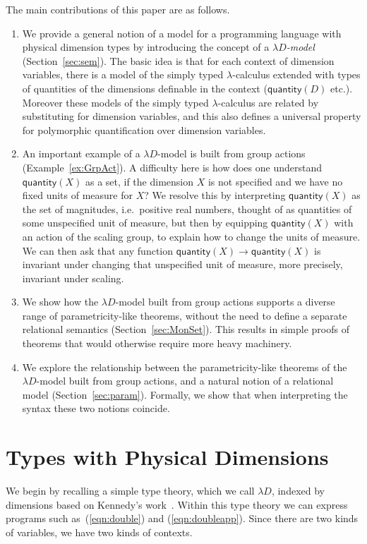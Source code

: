 \documentclass[a4paper,UKenglish]{lipics}
\newcommand{\msf}[1]{\mathsf{#1}} %
\newcommand{\qnt}{\msf{quantity}}
\newcommand{\Dvar}{X}
\begin{document}
The main contributions of this paper are as follows.
\begin{enumerate}
\item We provide a general notion of a model for a programming language with physical dimension types by introducing the concept of a \emph{$\lambda D$-model} (Section~\ref{sec:sem}). The basic idea is that for each context of dimension variables, there is a model of the simply typed $\lambda$-calculus extended with types of quantities of the dimensions definable in the context ($\qnt(D)$ etc.). Moreover these models of the simply typed $\lambda$-calculus are related by substituting for dimension variables, and this also defines a universal property for polymorphic quantification over dimension variables.

\item An important example of a $\lambda D$-model is built from group actions (Example~\ref{ex:GrpAct}).
A difficulty here is how does one understand $\qnt(\Dvar)$ as a set, if the dimension $\Dvar$ is not specified and we have no fixed units of measure for $\Dvar$? We resolve this by interpreting $\qnt(\Dvar)$ as the set of magnitudes, i.e.~positive real numbers, thought of as quantities of some unspecified unit of measure, but then by equipping $\qnt(\Dvar)$ with an action of the scaling group, to explain how to change the units of measure. We can then ask that any function $\qnt(\Dvar)\to\qnt(\Dvar)$ is invariant under changing that unspecified unit of measure, more precisely, invariant under scaling.

\item We show how the $\lambda D$-model built from group actions supports a diverse range of parametricity-like theorems, without the need to define a separate relational semantics (Section~\ref{sec:MonSet}). This results in simple proofs of theorems that would otherwise require more heavy machinery.

\item We explore the relationship between the parametricity-like theorems of the $\lambda D$-model built from group actions, and a natural notion of a relational model (Section~\ref{sec:param}). Formally, we show that when interpreting the syntax these two notions coincide.
\end{enumerate}


\section{Types with Physical Dimensions}
\label{sec:Not}
We begin by recalling a simple type theory, which we call $\lambda D$, indexed by dimensions based on Kennedy's work~\cite{Kennedy:1997:RPU:263699.263761}. Within this type theory we can express programs such as~(\ref{eqn:double}) and (\ref{eqn:doubleapp}). Since there are two kinds of variables, we have two kinds of contexts.
\end{document}
